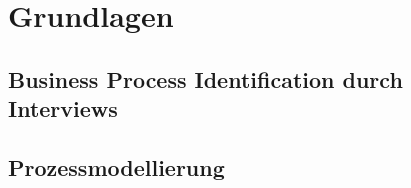 \section{Grundlagen}\label{sec:grundlagen}



\subsection{Business Process Identification durch Interviews}\label{subsec:interviews-grundlagen}


\subsection{Prozessmodellierung}\label{subsec:prozessmodellierung}

